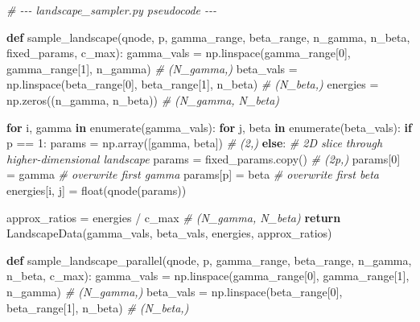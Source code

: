 \documentclass[
  11pt,
]{report}
\newenvironment{Shaded}{}{}
\newcommand{\BuiltInTok}[1]{\textcolor[rgb]{0.00,0.50,0.00}{#1}}
\newcommand{\CommentTok}[1]{\textcolor[rgb]{0.38,0.63,0.69}{\textit{#1}}}
\newcommand{\ControlFlowTok}[1]{\textcolor[rgb]{0.00,0.44,0.13}{\textbf{#1}}}
\newcommand{\DecValTok}[1]{\textcolor[rgb]{0.25,0.63,0.44}{#1}}
\newcommand{\KeywordTok}[1]{\textcolor[rgb]{0.00,0.44,0.13}{\textbf{#1}}}
\newcommand{\NormalTok}[1]{#1}
\newcommand{\OperatorTok}[1]{\textcolor[rgb]{0.40,0.40,0.40}{#1}}
\begin{document}
\begin{Shaded}
\begin{Highlighting}[]
\CommentTok{\# {-}{-}{-} landscape\_sampler.py pseudocode {-}{-}{-}}

\KeywordTok{def}\NormalTok{ sample\_landscape(qnode, p, gamma\_range, beta\_range, n\_gamma, n\_beta,}
\NormalTok{                     fixed\_params, c\_max):}
\NormalTok{    gamma\_vals }\OperatorTok{=}\NormalTok{ np.linspace(gamma\_range[}\DecValTok{0}\NormalTok{], gamma\_range[}\DecValTok{1}\NormalTok{], n\_gamma)  }\CommentTok{\# (N\_gamma,)}
\NormalTok{    beta\_vals }\OperatorTok{=}\NormalTok{ np.linspace(beta\_range[}\DecValTok{0}\NormalTok{], beta\_range[}\DecValTok{1}\NormalTok{], n\_beta)      }\CommentTok{\# (N\_beta,)}
\NormalTok{    energies }\OperatorTok{=}\NormalTok{ np.zeros((n\_gamma, n\_beta))                              }\CommentTok{\# (N\_gamma, N\_beta)}

    \ControlFlowTok{for}\NormalTok{ i, gamma }\KeywordTok{in} \BuiltInTok{enumerate}\NormalTok{(gamma\_vals):}
        \ControlFlowTok{for}\NormalTok{ j, beta }\KeywordTok{in} \BuiltInTok{enumerate}\NormalTok{(beta\_vals):}
            \ControlFlowTok{if}\NormalTok{ p }\OperatorTok{==} \DecValTok{1}\NormalTok{:}
\NormalTok{                params }\OperatorTok{=}\NormalTok{ np.array([gamma, beta])                        }\CommentTok{\# (2,)}
            \ControlFlowTok{else}\NormalTok{:}
                \CommentTok{\# 2D slice through higher{-}dimensional landscape}
\NormalTok{                params }\OperatorTok{=}\NormalTok{ fixed\_params.copy()                            }\CommentTok{\# (2p,)}
\NormalTok{                params[}\DecValTok{0}\NormalTok{] }\OperatorTok{=}\NormalTok{ gamma      }\CommentTok{\# overwrite first gamma}
\NormalTok{                params[p] }\OperatorTok{=}\NormalTok{ beta       }\CommentTok{\# overwrite first beta}
\NormalTok{            energies[i, j] }\OperatorTok{=} \BuiltInTok{float}\NormalTok{(qnode(params))}

\NormalTok{    approx\_ratios }\OperatorTok{=}\NormalTok{ energies }\OperatorTok{/}\NormalTok{ c\_max                                    }\CommentTok{\# (N\_gamma, N\_beta)}
    \ControlFlowTok{return}\NormalTok{ LandscapeData(gamma\_vals, beta\_vals, energies, approx\_ratios)}


\KeywordTok{def}\NormalTok{ sample\_landscape\_parallel(qnode, p, gamma\_range, beta\_range,}
\NormalTok{                              n\_gamma, n\_beta, c\_max):}
\NormalTok{    gamma\_vals }\OperatorTok{=}\NormalTok{ np.linspace(gamma\_range[}\DecValTok{0}\NormalTok{], gamma\_range[}\DecValTok{1}\NormalTok{], n\_gamma)  }\CommentTok{\# (N\_gamma,)}
\NormalTok{    beta\_vals }\OperatorTok{=}\NormalTok{ np.linspace(beta\_range[}\DecValTok{0}\NormalTok{], beta\_range[}\DecValTok{1}\NormalTok{], n\_beta)      }\CommentTok{\# (N\_beta,)}


\end{Highlighting}
\end{Shaded}
\end{document}
